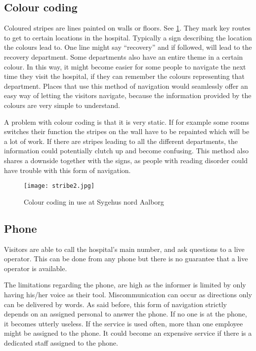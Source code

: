\subsection{Colour coding}\label{sub:col}
Coloured stripes are lines painted on walls or floors. See \cref{fig:colour_floor}. They mark key routes to get to certain locations in the hospital. Typically a sign describing the location the colours lead to. One line might say \enquote{recovery} and if followed, will lead to the recovery department. Some departments also have an entire theme in a certain colour. In this way, it might become easier for some people to navigate the next time they visit the hospital, if they can remember the colours representing that department.
Places that use this method of navigation would seamlessly offer an easy way of letting the visitors navigate, because the information provided by the colours are very simple to understand.

A problem with colour coding is that it is very static. If for example some rooms switches their function the stripes on the wall have to be repainted which will be a lot of work. If there are stripes leading to all the different departments, the information could potentially clutch up and become confusing. This method also shares a downside together with the signs, as people with reading disorder could have trouble with this form of navigation.

\begin{figure}[htb]
  \begin{center} 
    \texttt{[image: stribe2.jpg]}
  \end{center}
  \caption{Colour coding in use at Sygehus nord Aalborg}
  \label{fig:colour_floor}
\end{figure}




\subsection{Phone}\label{sub:pho}
Visitors are able to call the hospital's main number, and ask questions to a live operator. This can be done from any phone but there is no guarantee that a live operator is available. \cite{Vendsyssel}
 
The limitations regarding the phone, are high as the informer is limited by only having his/her voice as their tool. Miscommunication can occur as directions only can be delivered by words. As said before, this form of navigation strictly depends on an assigned personal to answer the phone. If no one is at the phone, it becomes utterly useless.
If the service is used often, more than one employee might be assigned to the phone. It could become an expensive service if there is a dedicated staff assigned to the phone.


